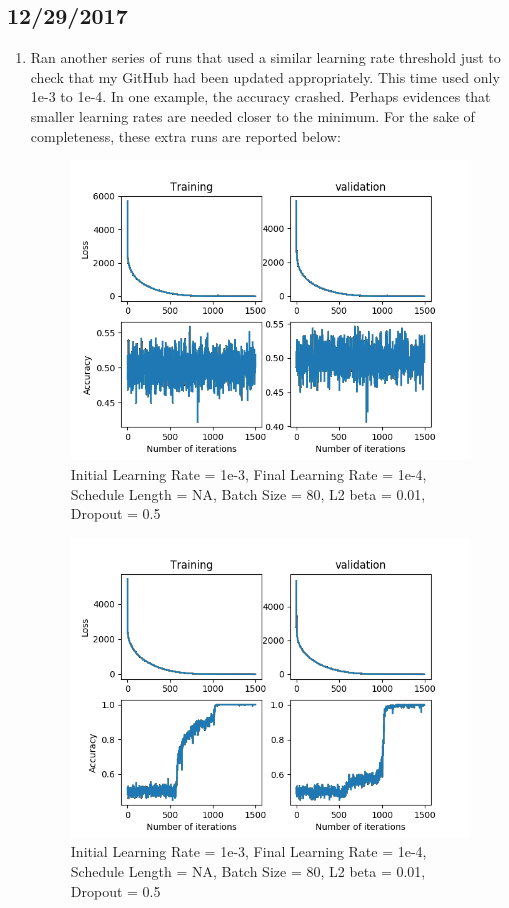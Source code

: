 \documentclass[12pt,reqno]{amsart}
\numberwithin{equation}{section}
\begin{document}
\subsection{12/29/2017}
\begin{enumerate}
\item Ran another series of runs that used a similar learning rate threshold just to check that my GitHub had been updated appropriately.  This time used only 1e-3 to 1e-4.  In one example, the accuracy crashed.  Perhaps evidences that smaller learning rates are needed closer to the minimum.  For the sake of completeness, these extra runs are reported below:  

\begin{figure}[H]
\centering
\includegraphics[scale=0.6]{Commit-test-1}
\caption{Initial Learning Rate = 1e-3, Final Learning Rate = 1e-4, Schedule Length = NA, Batch Size = 80, L2 beta = 0.01, Dropout = 0.5}
\end{figure}

\begin{figure}[H]
\centering
\includegraphics[scale=0.6]{Commit-test-2}
\caption{Initial Learning Rate = 1e-3, Final Learning Rate = 1e-4, Schedule Length = NA, Batch Size = 80, L2 beta = 0.01, Dropout = 0.5}
\end{figure}


\end{enumerate}
\end{document}
